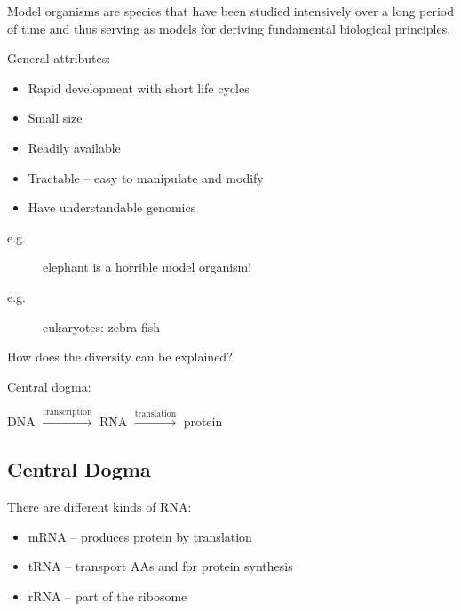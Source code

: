\documentclass[11pt]{scrartcl}
\begin{document}
\begin{definition}
  Model organisms are species that have been studied intensively over
  a long period of time and thus serving as models for deriving
  fundamental biological principles.
\end{definition}

General attributes:

\begin{itemize}
\item Rapid development with short life cycles

\item Small size

\item Readily available

\item Tractable -- easy to manipulate and modify

\item Have understandable genomics
\end{itemize}

\begin{description}

\item[e.g.] elephant is a horrible model organism!
\item[e.g.] eukaryotes: zebra fish

\end{description}

\begin{ques*}

How does the diversity can be explained?

\end{ques*}

\begin{answer*}

  Central dogma:

  DNA  $\xrightarrow{\text{transcription}}$  RNA  $\xrightarrow{\text{translation}}$  protein

\end{answer*}
\subsection{Central Dogma}
There are different kinds of RNA:

\begin{itemize}
\item mRNA -- produces protein by translation
\item tRNA -- transport AAs and for protein synthesis
\item rRNA -- part of the ribosome
\end{itemize}
\end{document}
